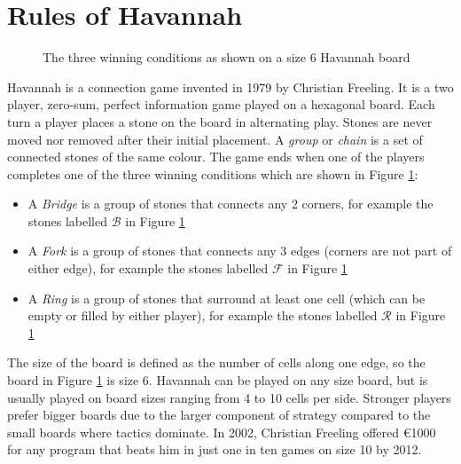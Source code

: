 
\section{Rules of Havannah}


\begin{figure}
\centering
\begin{HavannahBoard}[board size=6,coordinate style=classical]
\end{HavannahBoard}
\caption{The three winning conditions as shown on a size 6 Havannah board}
\label{fig:rules}
\end{figure}

Havannah is a connection game invented in 1979 by Christian Freeling. It is a two player, zero-sum, perfect information game played on a hexagonal board. Each turn a player places a stone on the board in alternating play. Stones are never moved nor removed after their initial placement. A \textit{group} or \textit{chain} is a set of connected stones of the same colour. The game ends when one of the players completes one of the three winning conditions which are shown in Figure \ref{fig:rules}:
\begin{itemize}
	\setlength{\itemsep}{0pt}
	\setlength{\parskip}{0pt}
	\setlength{\parsep}{0pt}
	\item A \textit{Bridge} is a group of stones that connects any 2 corners, for example the stones labelled $\mathcal B$ in Figure \ref{fig:rules}
	\item A \textit{Fork} is a group of stones that connects any 3 edges (corners are not part of either edge), for example the stones labelled $\mathcal F$ in Figure \ref{fig:rules}
	\item A \textit{Ring} is a group of stones that surround at least one cell (which can be empty or filled by either player), for example the stones labelled $\mathcal R$ in Figure \ref{fig:rules}
\end{itemize}

The size of the board is defined as the number of cells along one edge, so the board in Figure \ref{fig:rules} is size 6. Havannah can be played on any size board, but is usually played on board sizes ranging from 4 to 10 cells per side. Stronger players prefer bigger boards due to the larger component of strategy compared to the small boards where tactics dominate. In 2002, Christian Freeling offered \euro 1000 for any program that beats him in just one in ten games on size 10 by 2012.

